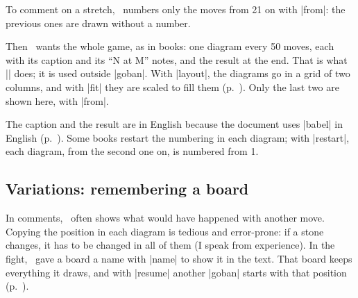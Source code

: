 \begin{goban}
To comment on a stretch, \karu\ numbers only the moves from 21 on with |from|: the previous ones are drawn without a number.

\begin{codeexample}[]
	\begin{goban}[sgf size = lee, captures, scale = 0.6]
	\end{goban}
\end{codeexample}

Then \karu\ wants the whole game, as in books: one diagram every 50 moves, each with its caption and its ``N at M'' notes, and the result at the end. That is what |\sgfdiagrams| does; it is used outside |goban|. With |layout|, the diagrams go in a grid of two columns, and with |fit| they are scaled to fill them (p.~\pageref{subsec:disposicion}). Only the last two are shown here, with |from|.

\begin{codeexample}
\end{codeexample}


The caption and the result are in English because the document uses |babel| in English (p.~\pageref{subsec:idiomas}). Some books restart the numbering in each diagram; with |restart|, each diagram, from the second one on, is numbered from 1.

\begin{codeexample}
\end{codeexample}


\subsection{Variations: remembering a board}
\label{tut:variantes}

In comments, \karu\ often shows what would have happened with another move. Copying the position in each diagram is tedious and error-prone: if a stone changes, it has to be changed in all of them (I speak from experience). In the fight, \karu\ gave a board a name with |name| to show it in the text. That board keeps everything it draws, and with |resume| another |goban| starts with that position (p.~\pageref{subsec:recordar}).


\end{goban}
